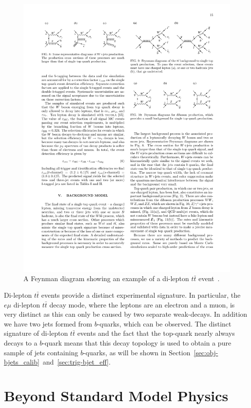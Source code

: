 \begin{figure}[!hbt]
  \begin{center}
    \includegraphics[width=0.6\linewidth, angle=0]{figs/Theory/ttbar.pdf}
  \end{center}
  \vspace{-1em}
  \caption[A Feynman diagram showing an example of a di-lepton $t\bar{t}$ event.]
          {A Feynman diagram showing an example of a di-lepton $t\bar{t}$ event~\cite{theo-ttbar_feyn}.}
          \label{fig:theo-ttbar}
  \vspace{-1em}
\end{figure}

Di-lepton $t\bar{t}$ events provide a distinct experimental signature.
In particular, the $e\mu$ di-lepton $t\bar{t}$ decay mode, where the leptons are an electron and a muon, is very distinct
as this can only be caused by two separate weak-decays.
In addition we have two jets formed from $b$-quarks, which can be observed.
The distinct signature of di-lepton $t\bar{t}$ events and the fact that the top-quark nearly always decays to a $b$-quark
means that this decay topology is used to obtain a pure sample of jets containing $b$-quarks,
as will be shown in Section~\ref{sec:obj-bjets_calib}~and~\ref{sec:trig-bjet_eff}.

\newpage
\section{Beyond Standard Model Physics}
\label{sec:theo-bsm}

